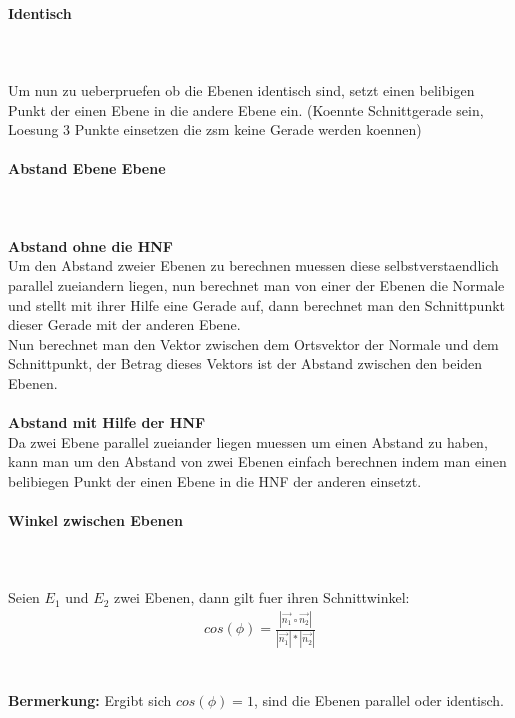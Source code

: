 \documentclass[a4paper]{article} %
\begin{document}
	\paragraph{Identisch}
		\hspace{0 cm} \\ \noindent \\
	Um nun zu ueberpruefen ob die Ebenen identisch sind, setzt einen belibigen Punkt der einen Ebene in die andere Ebene ein.
	(Koennte Schnittgerade sein, Loesung 3 Punkte einsetzen die zsm keine Gerade werden koennen)
	\paragraph{Abstand Ebene Ebene}
		\hspace{0 cm} \\ \noindent \\
	\textbf{Abstand ohne die HNF}\\
	Um den Abstand zweier Ebenen zu berechnen muessen diese selbstverstaendlich parallel zueiandern liegen, nun berechnet man von einer der Ebenen die Normale und stellt mit ihrer Hilfe eine Gerade auf, dann berechnet man den Schnittpunkt dieser Gerade mit der anderen Ebene.\\
	Nun berechnet man den Vektor zwischen dem Ortsvektor der Normale und dem Schnittpunkt, der Betrag dieses Vektors ist der Abstand zwischen den beiden Ebenen.\\\\
	\textbf{Abstand mit Hilfe der HNF}\\
	Da zwei Ebene parallel zueiander liegen muessen um einen Abstand zu haben, kann man um den Abstand von zwei Ebenen einfach berechnen indem man einen belibiegen Punkt der einen Ebene in die HNF der anderen einsetzt.
	\paragraph{Winkel zwischen Ebenen}
	\hspace{0 cm} \\ \noindent \\
	Seien $E_1$ und $E_2$ zwei Ebenen, dann gilt fuer ihren Schnittwinkel:
	\begin{align*}
		cos(\phi)= \frac{|\vec{n_1} \circ \vec{n_2}|}{|\vec{n_1}|*|\vec{n_2}|}
	\end{align*}\\\\
	\textbf{Bermerkung:}
	Ergibt sich $cos(\phi)=1$, sind die Ebenen parallel oder identisch.
\end{document}
